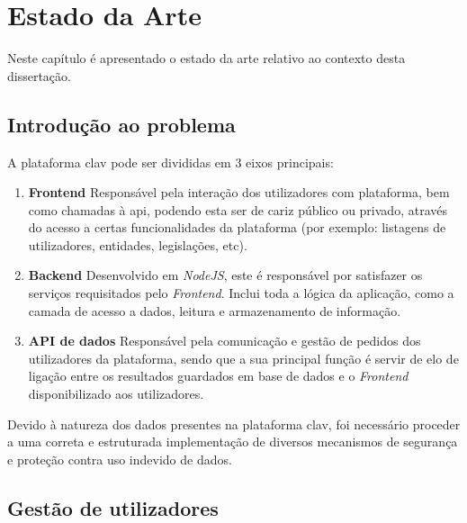 \chapter{Estado da Arte}

Neste capítulo é apresentado o estado da arte relativo ao contexto desta dissertação. 

\section{Introdução ao problema}

A plataforma \gls{clav} pode ser divididas em 3 eixos principais:

\begin{enumerate}
    \item \textbf{Frontend}
    Responsável pela interação dos utilizadores com plataforma, bem como chamadas à \gls{api}, podendo esta ser de cariz público ou privado, através do acesso a certas funcionalidades da plataforma (por exemplo: listagens de utilizadores, entidades, legislações, etc).
    
    \item \textbf{Backend}
    Desenvolvido em \emph{NodeJS}, este é responsável por satisfazer os serviços requisitados pelo \emph{Frontend}. Inclui toda a lógica da aplicação, como a camada de acesso a dados, leitura e armazenamento de informação.
    
    \item \textbf{API de dados}
    Responsável pela comunicação e gestão de pedidos dos utilizadores da plataforma, sendo que a sua principal função é servir de elo de ligação entre os resultados guardados em base de dados e o \emph{Frontend} disponibilizado aos utilizadores.
\end{enumerate}

Devido à natureza dos dados presentes na plataforma \gls{clav}, foi necessário proceder a uma correta e estruturada implementação de diversos mecanismos de segurança e proteção contra uso indevido de dados.

\cleardoublepage

\section{Gestão de utilizadores}

